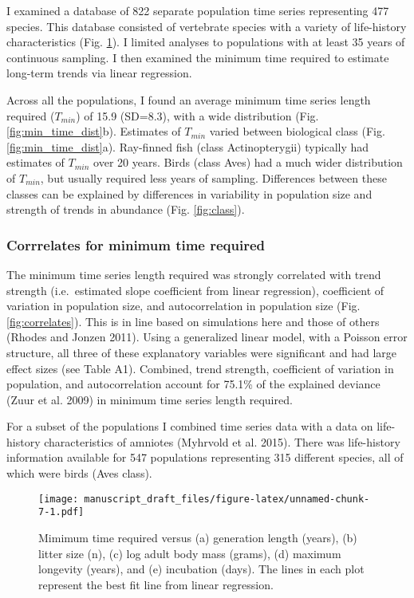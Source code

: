 \documentclass[12pt,]{article}
\begin{document}
\begin{spacing}{2}
I examined a database of 822 separate population time series
representing 477 species. This database consisted of vertebrate species
with a variety of life-history characteristics (Fig.
\ref{fig:biological_correlates}). I limited analyses to populations with
at least 35 years of continuous sampling. I then examined the minimum
time required to estimate long-term trends via linear regression.

Across all the populations, I found an average minimum time series
length required (\(T_{min}\)) of 15.9 (SD=8.3), with a wide distribution
(Fig. \ref{fig:min_time_dist}b). Estimates of \(T_{min}\) varied between
biological class (Fig. \ref{fig:min_time_dist}a). Ray-finned fish (class
Actinopterygii) typically had estimates of \(T_{min}\) over 20 years.
Birds (class Aves) had a much wider distribution of \(T_{min}\), but
usually required less years of sampling. Differences between these
classes can be explained by differences in variability in population
size and strength of trends in abundance (Fig. \ref{fig:class}).

\subsubsection{Corrrelates for minimum time
required}\label{corrrelates-for-minimum-time-required}

The minimum time series length required was strongly correlated with
trend strength (i.e.~estimated slope coefficient from linear
regression), coefficient of variation in population size, and
autocorrelation in population size (Fig. \ref{fig:correlates}). This is
in line based on simulations here and those of others (Rhodes and Jonzen
2011). Using a generalized linear model, with a Poisson error structure,
all three of these explanatory variables were significant and had large
effect sizes (see Table A1). Combined, trend strength, coefficient of
variation in population, and autocorrelation account for 75.1\% of the
explained deviance (Zuur et al. 2009) in minimum time series length
required.

For a subset of the populations I combined time series data with a data
on life-history characteristics of amniotes (Myhrvold et al. 2015).
There was life-history information available for 547 populations
representing 315 different species, all of which were birds (Aves
class).

\begin{figure}[htbp]
\centering
\texttt{[image: manuscript\_draft\_files/figure-latex/unnamed-chunk-7-1.pdf]}
\caption{Mimimum time required versus (a) generation length (years), (b)
litter size (n), (c) log adult body mass (grams), (d) maximum longevity
(years), and (e) incubation (days). The lines in each plot represent the
best fit line from linear regression.\label{fig:biological_correlates}}
\end{figure}


\end{spacing}
\end{document}
